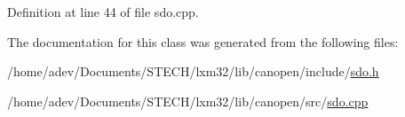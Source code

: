 Definition at line 44 of file sdo.\+cpp.



The documentation for this class was generated from the following files\+:\begin{DoxyCompactItemize}
\item 
/home/adev/\+Documents/\+S\+T\+E\+C\+H/lxm32/lib/canopen/include/\hyperlink{sdo_8h}{sdo.\+h}\item 
/home/adev/\+Documents/\+S\+T\+E\+C\+H/lxm32/lib/canopen/src/\hyperlink{sdo_8cpp}{sdo.\+cpp}\end{DoxyCompactItemize}
